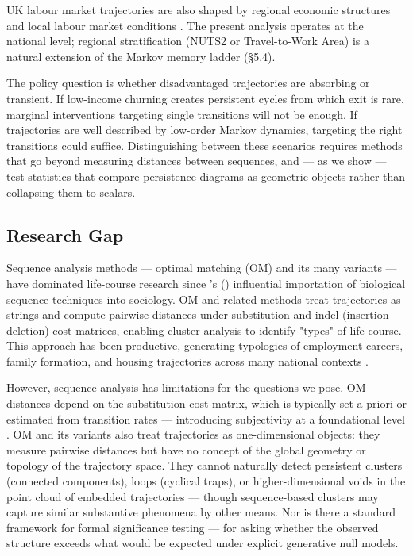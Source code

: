 UK labour market trajectories are also shaped by regional economic structures and local labour market conditions \citep{hmgov2022levelling}. The present analysis operates at the national level; regional stratification (NUTS2 or Travel-to-Work Area) is a natural extension of the Markov memory ladder (\S5.4).

The policy question is whether disadvantaged trajectories are absorbing or transient. If low-income churning creates persistent cycles from which exit is rare, marginal interventions targeting single transitions will not be enough. If trajectories are well described by low-order Markov dynamics, targeting the right transitions could suffice. Distinguishing between these scenarios requires methods that go beyond measuring distances between sequences, and --- as we show --- test statistics that compare persistence diagrams as geometric objects rather than collapsing them to scalars.

\subsection{Research Gap}

Sequence analysis methods --- optimal matching (OM) and its many variants --- have dominated life-course research since \citeauthor{abbott1995sequence}'s (\citeyear{abbott1995sequence}) influential importation of biological sequence techniques into sociology. OM and related methods treat trajectories as strings and compute pairwise distances under substitution and indel (insertion-deletion) cost matrices, enabling cluster analysis to identify "types" of life course. This approach has been productive, generating typologies of employment careers, family formation, and housing trajectories across many national contexts \citep{abbott2000sequence, lesnard2010setting, gauthier2010multichannel}.

However, sequence analysis has limitations for the questions we pose. OM distances depend on the substitution cost matrix, which is typically set a priori or estimated from transition rates --- introducing subjectivity at a foundational level \citep{robette2008comparing}. OM and its variants also treat trajectories as one-dimensional objects: they measure pairwise distances but have no concept of the global geometry or topology of the trajectory space. They cannot naturally detect persistent clusters (connected components), loops (cyclical traps), or higher-dimensional voids in the point cloud of embedded trajectories --- though sequence-based clusters may capture similar substantive phenomena by other means. Nor is there a standard framework for formal significance testing --- for asking whether the observed structure exceeds what would be expected under explicit generative null models.

